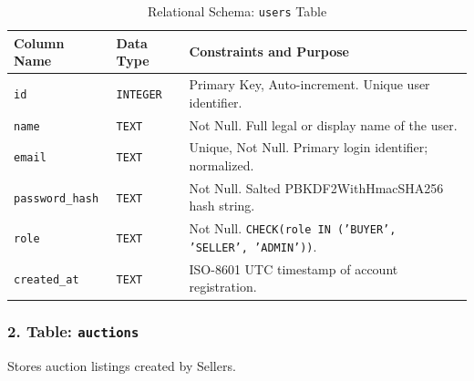 \begin{table}[H]
\centering
\small
\caption{Relational Schema: \texttt{users} Table}
\label{tab:schema_users}
\begin{tabularx}{\textwidth}{p{3cm}p{2.5cm}X}
\toprule
\textbf{Column Name} & \textbf{Data Type} & \textbf{Constraints and Purpose} \\
\midrule
\texttt{id} & \texttt{INTEGER} & Primary Key, Auto-increment. Unique user identifier. \\
\texttt{name} & \texttt{TEXT} & Not Null. Full legal or display name of the user. \\
\texttt{email} & \texttt{TEXT} & Unique, Not Null. Primary login identifier; normalized. \\
\texttt{password\_hash} & \texttt{TEXT} & Not Null. Salted PBKDF2WithHmacSHA256 hash string. \\
\texttt{role} & \texttt{TEXT} & Not Null. \texttt{CHECK(role IN ('BUYER', 'SELLER', 'ADMIN'))}. \\
\texttt{created\_at} & \texttt{TEXT} & ISO-8601 UTC timestamp of account registration. \\
\bottomrule
\end{tabularx}
\end{table}

\subsubsection{2. Table: \texttt{auctions}}
Stores auction listings created by Sellers.

